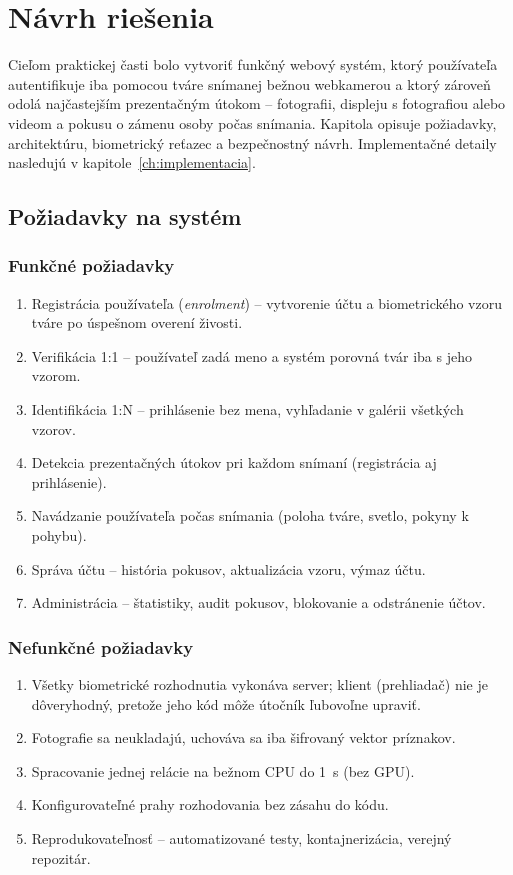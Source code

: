 \chapter{Návrh riešenia}
\label{ch:navrh}

Cieľom praktickej časti bolo vytvoriť funkčný webový systém, ktorý používateľa
autentifikuje iba pomocou tváre snímanej bežnou webkamerou a ktorý zároveň odolá
najčastejším prezentačným útokom -- fotografii, displeju s fotografiou alebo videom
a pokusu o zámenu osoby počas snímania. Kapitola opisuje požiadavky, architektúru,
biometrický reťazec a bezpečnostný návrh. Implementačné detaily nasledujú
v kapitole~\ref{ch:implementacia}.

\section{Požiadavky na systém}

\subsection*{Funkčné požiadavky}
\begin{enumerate}[label=F\arabic*]
  \item Registrácia používateľa (\emph{enrolment}) – vytvorenie účtu a biometrického
        vzoru tváre po úspešnom overení živosti.
  \item Verifikácia 1:1 – používateľ zadá meno a systém porovná tvár iba s jeho vzorom.
  \item Identifikácia 1:N – prihlásenie bez mena, vyhľadanie v galérii všetkých vzorov.
  \item Detekcia prezentačných útokov pri každom snímaní (registrácia aj prihlásenie).
  \item Navádzanie používateľa počas snímania (poloha tváre, svetlo, pokyny k pohybu).
  \item Správa účtu – história pokusov, aktualizácia vzoru, výmaz účtu.
  \item Administrácia – štatistiky, audit pokusov, blokovanie a odstránenie účtov.
\end{enumerate}

\subsection*{Nefunkčné požiadavky}
\begin{enumerate}[label=N\arabic*]
  \item Všetky biometrické rozhodnutia vykonáva server; klient (prehliadač) nie je
        dôveryhodný, pretože jeho kód môže útočník ľubovoľne upraviť.
  \item Fotografie sa neukladajú, uchováva sa iba šifrovaný vektor príznakov.
  \item Spracovanie jednej relácie na bežnom CPU do 1~s (bez GPU).
  \item Konfigurovateľné prahy rozhodovania bez zásahu do kódu.
  \item Reprodukovateľnosť – automatizované testy, kontajnerizácia, verejný repozitár.
\end{enumerate}

